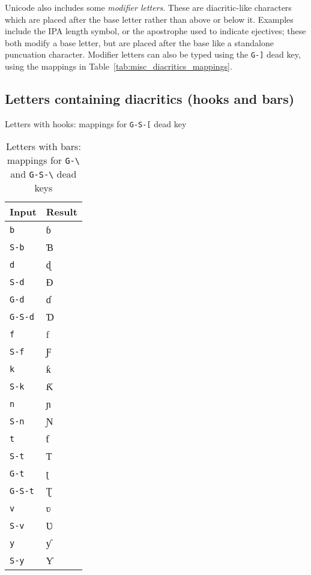 \documentclass[oneside]{memoir}
\newcommand{\key}{\verb}
\begin{document}
Unicode also includes some \textit{modifier letters}.
These are diacritic-like characters which are placed after the base letter rather than above or below it.
Examples include the \textsc{IPA} length symbol, or the apostrophe used to indicate ejectives;
  these both modify a base letter, but are placed after the base like a standalone puncuation character.
Modifier letters can also be typed using the \key|G-]| dead key, using the mappings in Table~\ref{tab:misc_diacritics_mappings}.

\subsection{Letters containing diacritics (hooks and bars)}
\label{sec:letters_containing_diacritics}

\begin{table}
\centerfloat
\begin{minipage}{0.16\paperwidth}
\centering
\cprotect\caption{Letters with hooks: mappings for \key|G-S-[| dead key}
\label{tab:hook_mappings}
\begin{tabular}{ll}
\toprule
Input & Result \\
\midrule
\key|b| & ɓ \\
\key|S-b| & Ɓ \\
\key|d| & ɖ \\
\key|S-d| & Ɖ \\
\key|G-d| & ɗ \\
\key|G-S-d| & Ɗ \\
\key|f| & ƒ \\
\key|S-f| & Ƒ \\
\key|k| & ƙ \\
\key|S-k| & Ƙ \\
\key|n| & ɲ \\
\key|S-n| & Ɲ \\
\key|t| & ƭ \\
\key|S-t| & Ƭ \\
\key|G-t| & ʈ \\
\key|G-S-t| & Ʈ \\
\key|v| & ʋ \\
\key|S-v| & Ʋ \\
\key|y| & ƴ \\
\key|S-y| & Ƴ \\
\bottomrule
\end{tabular}
\end{minipage}\hfill
\begin{minipage}{0.55\paperwidth}
\centering
\cprotect\caption{Letters with bars: mappings for \key|G-\| and \key|G-S-\| dead keys}

\end{minipage}
\end{table}
\end{document}
